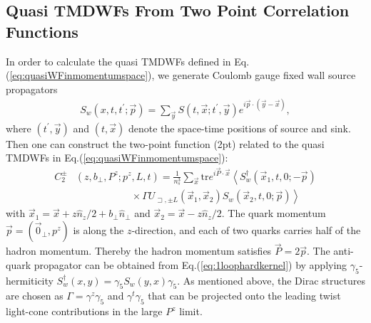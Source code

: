 \documentclass[prd,aps,twocolumn,preprintnumbers, showpacs, nofootinbib,superscriptaddress,notitlepage]{revtex4-1}
\newcommand\bl{\color{blue}}
\begin{document}
\subsection{Quasi TMDWFs From Two Point Correlation Functions}
\label{sec:quasi-WF_from_2pt}
In order to calculate the quasi TMDWFs  defined in Eq.(\ref{eq:quasiWFinmomentumspace}), we generate {\bl Coulomb gauge fixed wall source propagators}
\begin{align}
S_{w}\left(x, t, t^{\prime} ; \vec{p}\right)=\sum_{\vec{y}} S\left(t, \vec{x} ; t^{\prime}, \vec{y}\right) e^{i \vec{p} \cdot(\vec{y}-\vec{x})}, \label{eq:wallsource}
\end{align}
where $(t^{\prime},\vec{y})$ and $(t,\vec{x})$ denote the {\bl space-time} positions of source and sink. Then one  can construct the two-point function (2pt) related to the quasi TMDWFs  in Eq.(\ref{eq:quasiWFinmomentumspace}):
\begin{align}
C_2^{\pm}&	\left(z,b_{\perp},P^z; p^z,L,t \right)=\frac{1}{n_s^3}\sum_{\vec{x}}\mathrm{tr} e^{i\vec{P}\cdot\vec{x}}\left\langle S_w^{\dagger}\left(\vec{x}_1,t,0;-\vec{p}\right)\right. \nonumber\\
&\;\;\;\;\;\;\;\;\;\; \;\;\;\;\;\;\;\;\;\;    \times \left. \Gamma U_{\sqsupset, \pm L}\left(\vec{x}_1,\vec{x}_2\right) S_w\left(\vec{x}_2,t,0;\vec{p} \right)  \right\rangle
\label{eq:nonlocal2pt}
\end{align}
with $\vec{x}_1=\vec{x}+z\hat{n}_z/2+b_{\perp}\hat{n}_{\perp}$ and  $\vec{x}_2=\vec{x}-z \hat{n}_{z}/2$. The quark momentum $\vec{p}=(\vec{0}_{\perp},p^z)$ is along the $z$-direction, and each of two quarks carries {\bl half of the} hadron momentum. Thereby the hadron momentum satisfies  $\vec{P}=2\vec{p}$. The anti-quark propagator can be obtained from Eq.(\ref{eq:1loophardkernel}) by applying $\gamma_5$-{\bl hermiticity} $S_w^{\dagger}(x,y)=\gamma_5S_w(y,x)\gamma_5$. As mentioned above, the Dirac structures are chosen as $\Gamma=\gamma^z\gamma_5$ and $\gamma^t\gamma_5$ that can be projected onto the leading twist light-cone contributions in the large $P^z$ limit.
 
\end{document}
